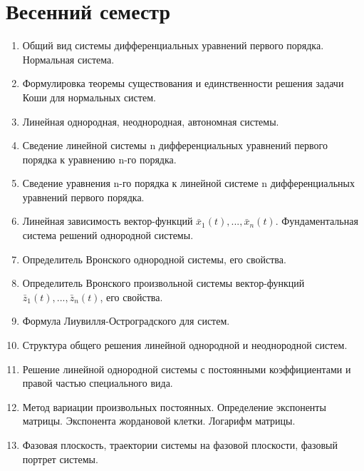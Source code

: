 \documentclass{article}
\begin{document}
\section{Весенний семестр}
\begin{enumerate}
  \item Общий вид системы дифференциальных уравнений первого порядка. Нормальная система.

  \item Формулировка теоремы существования и единственности решения задачи Коши для нормальных систем.

  \item Линейная однородная, неоднородная, автономная системы.

  \item Сведение линейной системы n дифференциальных уравнений первого порядка к уравнению n-го порядка.

  \item Сведение уравнения n-го порядка к линейной системе n дифференциальных уравнений первого порядка.

  \item Линейная зависимость вектор-функций $\bar{x}_1(t), ..., \bar{x}_n(t)$. Фундаментальная система решений однородной системы.

  \item Определитель Вронского однородной системы, его свойства.

  \item Определитель Вронского произвольной системы вектор-функций $\bar{z}_1(t), ..., \bar{z}_n(t)$, его свойства.

  \item Формула Лиувилля-Остроградского для систем.

  \item Структура общего решения линейной однородной и неоднородной систем.

  \item Решение линейной однородной системы с постоянными коэффициентами и правой частью специального вида.

  \item Метод вариации произвольных постоянных. Определение экспоненты матрицы. Экспонента жордановой клетки. Логарифм матрицы.

  \item Фазовая плоскость, траектории системы на фазовой плоскости, фазовый портрет системы.


\end{enumerate}
\end{document}
